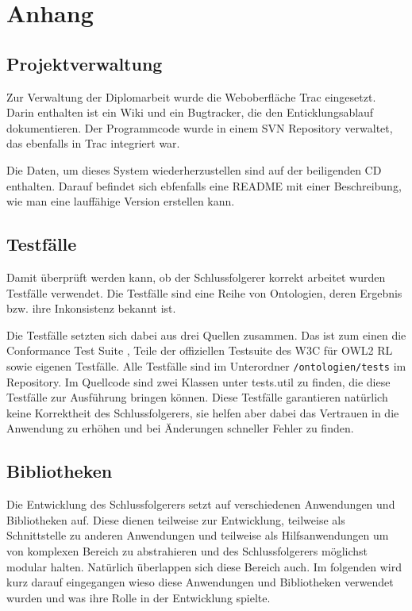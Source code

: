 \chapter{Anhang}

\section{Projektverwaltung}
Zur Verwaltung der Diplomarbeit wurde die Weboberfläche Trac eingesetzt. Darin enthalten ist ein Wiki und ein Bugtracker, die den Enticklungsablauf dokumentieren. Der Programmcode wurde in einem SVN Repository verwaltet, das ebenfalls in Trac integriert war.

Die Daten, um dieses System wiederherzustellen sind auf der beiligenden CD enthalten. Darauf befindet sich ebfenfalls eine README mit einer Beschreibung, wie man eine lauffähige Version erstellen kann.

\section{Testfälle}
Damit überprüft werden kann, ob der Schlussfolgerer korrekt arbeitet wurden Testfälle verwendet. Die Testfälle sind eine Reihe von Ontologien, deren Ergebnis bzw. ihre Inkonsistenz bekannt ist.

Die Testfälle setzten sich dabei aus drei Quellen zusammen. Das ist zum einen die Conformance Test Suite \cite{Schneider2009}, Teile der offiziellen Testsuite des W3C für OWL2 RL \cite{SWTestcases} sowie eigenen Testfälle. Alle Testfälle sind im Unterordner \texttt{/ontologien/tests} im Repository. Im Quellcode sind zwei Klassen unter tests.util zu finden, die diese Testfälle zur Ausführung bringen können. Diese Testfälle garantieren natürlich keine Korrektheit des Schlussfolgerers, sie helfen aber dabei das Vertrauen in die Anwendung zu erhöhen und bei Änderungen schneller Fehler zu finden.

\section{Bibliotheken}
Die Entwicklung des Schlussfolgerers setzt auf verschiedenen Anwendungen und Bibliotheken auf. Diese dienen teilweise zur Entwicklung, teilweise als Schnittstelle zu anderen Anwendungen und teilweise als Hilfsanwendungen um von komplexen Bereich zu abstrahieren und des Schlussfolgerers möglichst modular halten. Natürlich überlappen sich diese Bereich auch. Im folgenden wird kurz darauf eingegangen wieso diese Anwendungen und Bibliotheken verwendet wurden und was ihre Rolle in der Entwicklung spielte.

